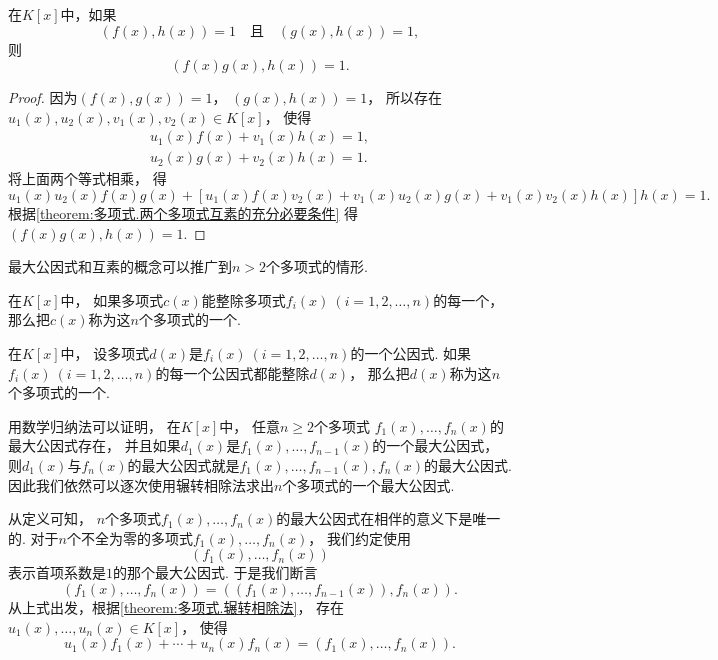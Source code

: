 \begin{property}
在\(K[x]\)中，如果\[
	(f(x),h(x))=1
	\quad\text{且}\quad
	(g(x),h(x))=1,
\]
则\[
	(f(x) g(x),h(x))=1.
\]
\begin{proof}
因为\((f(x),g(x))=1\)，
\((g(x),h(x))=1\)，
所以存在\(u_1(x),u_2(x),v_1(x),v_2(x) \in K[x]\)，
使得\begin{gather*}
	u_1(x) f(x) + v_1(x) h(x) = 1, \\
	u_2(x) g(x) + v_2(x) h(x) = 1.
\end{gather*}
将上面两个等式相乘，
得\[
	u_1(x) u_2(x) f(x) g(x)
	+ [
		u_1(x) f(x) v_2(x)
		+ v_1(x) u_2(x) g(x)
		+ v_1(x) v_2(x) h(x)
	] h(x)
	= 1.
\]
根据\cref{theorem:多项式.两个多项式互素的充分必要条件}
得\((f(x) g(x),h(x))=1\).
\end{proof}
\end{property}

最大公因式和互素的概念可以推广到\(n>2\)个多项式的情形.
\begin{definition}
在\(K[x]\)中，
如果多项式\(c(x)\)能整除多项式\(f_i(x)\ (i=1,2,\dotsc,n)\)的每一个，
那么把\(c(x)\)称为这\(n\)个多项式的一个.
\end{definition}

\begin{definition}
在\(K[x]\)中，
设多项式\(d(x)\)是\(f_i(x)\ (i=1,2,\dotsc,n)\)的一个公因式.
如果\(f_i(x)\ (i=1,2,\dotsc,n)\)的每一个公因式都能整除\(d(x)\)，
那么把\(d(x)\)称为这\(n\)个多项式的一个.
\end{definition}

用数学归纳法可以证明，
在\(K[x]\)中，
任意\(n\geq2\)个多项式
\(f_1(x),\dotsc,f_n(x)\)的最大公因式存在，
并且如果\(d_1(x)\)是\(f_1(x),\dotsc,f_{n-1}(x)\)的一个最大公因式，
则\(d_1(x)\)与\(f_n(x)\)的最大公因式就是\(f_1(x),\dotsc,f_{n-1}(x),f_n(x)\)的最大公因式.
因此我们依然可以逐次使用辗转相除法求出\(n\)个多项式的一个最大公因式.

从定义可知，
\(n\)个多项式\(f_1(x),\dotsc,f_n(x)\)的最大公因式在相伴的意义下是唯一的.
对于\(n\)个不全为零的多项式\(f_1(x),\dotsc,f_n(x)\)，
我们约定使用\[
	(f_1(x),\dotsc,f_n(x))
\]表示首项系数是\(1\)的那个最大公因式.
于是我们断言\[
	(f_1(x),\dotsc,f_n(x))
	= ((f_1(x),\dotsc,f_{n-1}(x)),f_n(x)).
\]
从上式出发，根据\cref{theorem:多项式.辗转相除法}，
存在\(u_1(x),\dotsc,u_n(x) \in K[x]\)，
使得\[
	u_1(x) f_1(x) + \dotsb + u_n(x) f_n(x)
	= (f_1(x),\dotsc,f_n(x)).
\]

